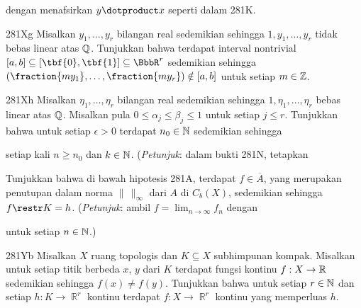 {
      
      
\noindent dengan menafsirkan $y\dotproduct x$ seperti dalam 281K.
      
\spheader 281Xg Misalkan $y_1,\ldots,y_r$ bilangan real sedemikian sehingga
$1,y_1,\ldots,y_r$ tidak bebas linear atas $\Bbb Q$. Tunjukkan bahwa terdapat
interval nontrivial $[a,b]\subseteq[\tbf{0},\tbf{1}]\subseteq\BbbR^r$
sedemikian sehingga $(\fraction{my_1},\ldots,\fraction{my_r})\notin[a,b]$
untuk setiap $m\in\Bbb Z$.
      
\spheader 281Xh Misalkan $\eta_1,\ldots,\eta_r$ bilangan real sedemikian
sehingga $1,\eta_1,\ldots,\eta_r$ bebas linear atas $\Bbb Q$. Misalkan pula
$0\le\alpha_j\le\beta_j\le 1$ untuk setiap $j\le r$. Tunjukkan bahwa untuk
setiap $\epsilon>0$ terdapat $n_0\in\Bbb N$ sedemikian sehingga
      
      
\noindent setiap kali $n\ge n_0$ dan $k\in\Bbb N$. ({\it Petunjuk\/}:
dalam bukti 281N, tetapkan
      
      
 Tunjukkan bahwa di bawah hipotesis 281A,
terdapat $f\in\overline{A}$, yang merupakan penutupan dalam norma
$\|\,\|_{\infty}$ dari $A$ di $C_b(X)$, sedemikian sehingga
$f\restr K=h$. ({\it Petunjuk\/}: ambil
$f=\lim_{n\to\infty}f_n$ dengan
      
      
\noindent untuk setiap $n\in\Bbb N$.)
      
\spheader 281Yb Misalkan $X$ ruang topologis dan $K\subseteq X$ subhimpunan
kompak. Misalkan untuk setiap titik berbeda $x$, $y$ dari $K$ terdapat fungsi
kontinu $f:X\to\Bbb R$ sedemikian sehingga $f(x)\ne f(y)$. Tunjukkan bahwa
untuk setiap $r\in\Bbb N$ dan setiap $h:K\to\BbbR^r$ kontinu terdapat
$f:X\to\BbbR^r$ kontinu yang memperluas $h$.
      
}
